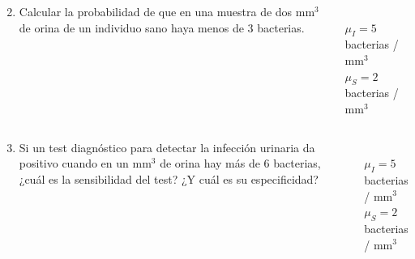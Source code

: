 \documentclass[aspectratio=149,10pt,t]{beamer}
\begin{document}
\begin{frame}
\begin{columns}
\begin{column}[T]{0.7\textwidth}
\begin{enumerate}
\setcounter{enumi}{1}
\item Calcular la probabilidad de que en una muestra de dos mm$^3$ de orina de un individuo sano haya menos de 3 bacterias.
\end{enumerate}
\end{column}
\begin{column}[T]{0.3\textwidth}
\\
$\mu_I = 5$ bacterias / mm$^3$\\
$\mu_S = 2$ bacterias / mm$^3$\\
\end{column}
\end{columns}
\end{frame}


\begin{frame}
\begin{columns}
\begin{column}[T]{0.7\textwidth}
\begin{enumerate}
\setcounter{enumi}{2}
\item Si un test diagnóstico para detectar la infección urinaria da positivo cuando en un mm$^3$ de orina hay más de 6 bacterias,
¿cuál es la sensibilidad del test? ¿Y cuál es su especificidad?
\end{enumerate}
\end{column}
\begin{column}[T]{0.3\textwidth}
\\
$\mu_I = 5$ bacterias / mm$^3$\\
$\mu_S = 2$ bacterias / mm$^3$\\
\end{column}
\end{columns}
\end{frame}
\end{document}
